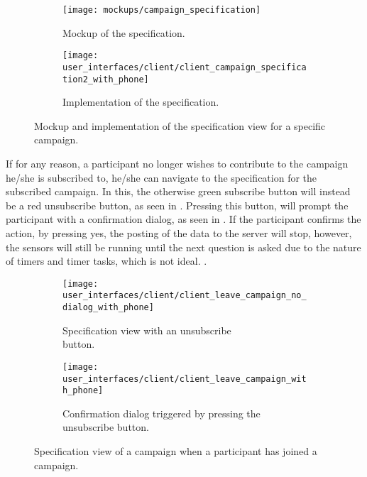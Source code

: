 \begin{figure}[!htbp]
    \begin{subfigure}[!t]{.48\textwidth}
        \centering
        \texttt{[image: mockups/campaign\_specification]}
        \caption{Mockup of the specification.}
        \label{fig:mockup_campaign_specification}
    \end{subfigure}%
    \begin{subfigure}[!t]{.52\textwidth}
        \centering
        \texttt{[image: user\_interfaces/client/client\_campaign\_specification2\_with\_phone]}
        \caption{Implementation of the specification.}
        \label{fig:implementation_campaign_specification}
    \end{subfigure}
    \caption{Mockup and implementation of the specification view for a specific campaign.}
    \label{fig:campaign_specification}
\end{figure}
\FloatBarrier

If for any reason, a participant no longer wishes to contribute to the campaign he/she is subscribed to, he/she can navigate to the specification for the subscribed campaign. In this, the otherwise green subscribe button will instead be a red unsubscribe button, as seen in . Pressing this button, will prompt the participant with a confirmation dialog, as seen in . If the participant confirms the action, by pressing yes, the posting of the data to the server will stop, however, the sensors will still be running until the next question is asked due to the nature of timers and timer tasks, which is not ideal.  . 

\begin{figure}[!htbp]
    \begin{subfigure}[!t]{.50\textwidth}
        \centering
        \texttt{[image: user\_interfaces/client/client\_leave\_campaign\_no\_dialog\_with\_phone]}
        \caption{Specification view with an unsubscribe \\\hspace{\textwidth}button.}
        \label{fig:leave_campaign_no_dialog}
    \end{subfigure}%
    \begin{subfigure}[!t]{.50\textwidth}
        \centering
        \texttt{[image: user\_interfaces/client/client\_leave\_campaign\_with\_phone]}
        \caption{Confirmation dialog triggered by pressing the unsubscribe button.}
        \label{fig:leave_campaign_dialog}
    \end{subfigure}
    \caption{Specification view of a campaign when a participant has joined a campaign.}
    \label{fig:leave_campaign}
\end{figure}
\FloatBarrier

